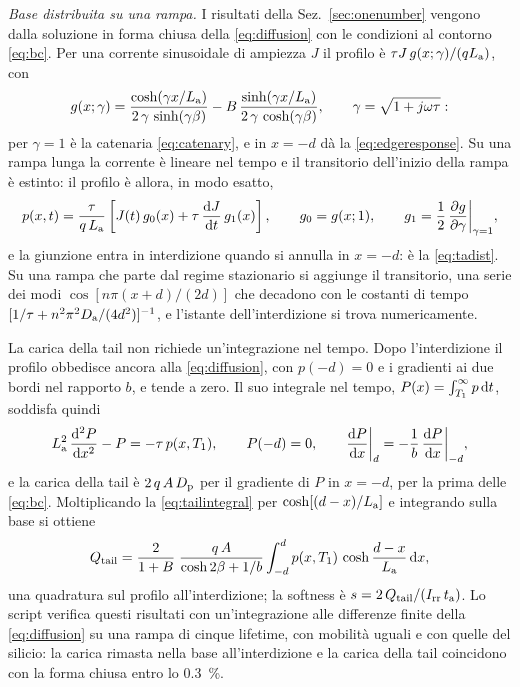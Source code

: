 \documentclass[10pt,a4paper]{scrartcl}
\let\newcommand\pdvaluedefine
\newcommand{\Irr}{I_\mathrm{rr}}
\newcommand{\ta}{t_\mathrm{a}}
\newcommand{\Tone}{T_1}
\newcommand{\diff}{\mathrm{d}}
\newcommand{\Da}{D_\mathrm{a}}
\newcommand{\La}{L_\mathrm{a}}
\newcommand{\Dp}{D_\mathrm{p}}
\newcommand{\dpar}[2]{\frac{\partial #1}{\partial #2}}
\begin{document}
\emph{Base distribuita su una rampa.} I risultati della Sez.~\ref{sec:onenumber} vengono dalla soluzione in forma chiusa della \eqref{eq:diffusion} con le condizioni al contorno \eqref{eq:bc}. Per una corrente sinusoidale di ampiezza $J$ il profilo è $\tau J\,g(x;\gamma)/(q\La)$, con
\begin{equation}
g(x;\gamma) = \frac{\cosh(\gamma x/\La)}{2\,\gamma\,\sinh(\gamma\beta)} - B\,\frac{\sinh(\gamma x/\La)}{2\,\gamma\,\cosh(\gamma\beta)} , \qquad \gamma = \sqrt{1+j\omega\tau} :
\label{eq:gprofile}
\end{equation}
per $\gamma = 1$ è la catenaria \eqref{eq:catenary}, e in $x = -d$ dà la \eqref{eq:edgeresponse}. Su una rampa lunga la corrente è lineare nel tempo e il transitorio dell'inizio della rampa è estinto: il profilo è allora, in modo esatto,
\begin{equation}
p(x,t) = \frac{\tau}{q\,\La}\left[J(t)\,g_0(x) + \tau\,\frac{\diff J}{\diff t}\,g_1(x)\right] , \qquad g_0 = g(x;1) , \qquad g_1 = \frac12\,\dpar{g}{\gamma}\bigg|_{\gamma=1} ,
\label{eq:rampprofile}
\end{equation}
e la giunzione entra in interdizione quando si annulla in $x = -d$: è la \eqref{eq:tadist}. Su una rampa che parte dal regime stazionario si aggiunge il transitorio, una serie dei modi $\cos[n\pi(x+d)/(2d)]$ che decadono con le costanti di tempo $[1/\tau + n^2\pi^2\Da/(4d^2)]^{-1}$, e l'istante dell'interdizione si trova numericamente.

La carica della tail non richiede un'integrazione nel tempo. Dopo l'interdizione il profilo obbedisce ancora alla \eqref{eq:diffusion}, con $p(-d) = 0$ e i gradienti ai due bordi nel rapporto $b$, e tende a zero. Il suo integrale nel tempo, $P(x) = \int_{\Tone}^{\infty} p\,\diff t$, soddisfa quindi
\begin{equation}
\La^2\,\frac{\diff^2 P}{\diff x^2} - P = -\tau\,p(x,\Tone) , \qquad P(-d) = 0 , \qquad \frac{\diff P}{\diff x}\bigg|_{d} = -\frac1b\,\frac{\diff P}{\diff x}\bigg|_{-d} ,
\label{eq:tailintegral}
\end{equation}
e la carica della tail è $2\,q\,A\,\Dp$ per il gradiente di $P$ in $x = -d$, per la prima delle \eqref{eq:bc}. Moltiplicando la \eqref{eq:tailintegral} per $\cosh[(d-x)/\La]$ e integrando sulla base si ottiene
\begin{equation}
Q_\mathrm{tail} = \frac{2}{1+B}\;\frac{q\,A}{\cosh 2\beta + 1/b}\int_{-d}^{d} p(x,\Tone)\,\cosh\frac{d-x}{\La}\,\diff x ,
\label{eq:qtail}
\end{equation}
una quadratura sul profilo all'interdizione; la softness è $s = 2\,Q_\mathrm{tail}/(\Irr\,\ta)$. Lo script verifica questi risultati con un'integrazione alle differenze finite della \eqref{eq:diffusion} su una rampa di cinque lifetime, con mobilità uguali e con quelle del silicio: la carica rimasta nella base all'interdizione e la carica della tail coincidono con la forma chiusa entro lo \SI{0.3}{\percent}.
\end{document}
